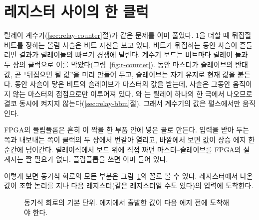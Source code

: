 \section{레지스터 사이의 한 클럭}

\Relay 릴레이 계수기(\ref{sec:relay-counter}절)가 같은 문제를 이미 풀었다. 1을 더할 때 뒤집힐 비트를 정하는
올림 사슬은 비트 자신을 보고 있다. 비트가 뒤집히는 동안 사슬이 흔들리면 결과가 릴레이들의 빠르기 경쟁에
달린다. 계수기 보드는 비트마다 릴레이 둘과 두 상의 클럭으로 이를 막았다(그림~\ref{fig:r-counter}).
 동안 마스터가 슬레이브의 반대값, 곧 ``뒤집으면 될 값''을 미리 만들어 두고, 슬레이브는 자기 유지로
현재 값을 붙든다.  동안 사슬이 닿은 비트의 슬레이브가 마스터의 값을 받는데, 사슬은 그동안 움직이지
않는 마스터의 접점으로만 이루어져 있다. 와 는 릴레이 하나의 한 극에서 나오므로 결코 동시에
켜지지 않는다(\ref{sec:relay-bbm}절). 그래서 계수기의 값은  펄스에서만 움직인다.

FPGA의 플립플롭은 흔히 이 짝을 한 부품 안에 넣은 꼴로 만든다. 입력을 받아 두는 쪽과 내보내는 쪽이 클럭의
두 상에서 번갈아 열리고, 바깥에서 보면 값이 상승 에지 한 순간에 넘어간다. 릴레이식에서 보드 위에 직접 짜던
마스터--슬레이브를 FPGA의 설계자는 짤 필요가 없다. 플립플롭을 쓰면 이미 들어 있다.

이렇게 보면 동기식 회로의 모든 부분은 그림~\ref{fig:g-rcr}의 꼴로 볼 수 있다. 레지스터에서 나온 값이 조합
논리를 지나 다음 레지스터(같은 레지스터일 수도 있다)의 입력에 도착한다.

\begin{figure}[ht]
\centering
{}
\caption{동기식 회로의 기본 단위. 에지에서 출발한 값이 다음 에지 전에 도착해야 한다.}
\label{fig:g-rcr}
\end{figure}

